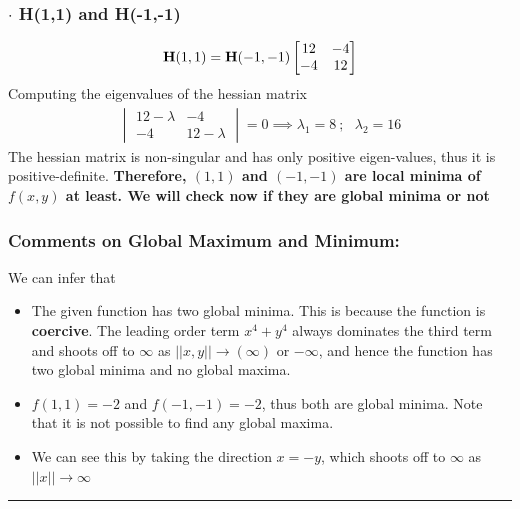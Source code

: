 \subsubsection*{$\bm\cdot$ H(1,1) and H(-1,-1)}
\begin{align*}
{\bf H} (1,1) = {\bf H} (-1,-1)
\begin{bmatrix}
12 & -4 \\
-4 & 12
\end{bmatrix}
\end{align*}
Computing the eigenvalues of the hessian matrix
\begin{align*}
\begin{vmatrix}
12-\lambda & -4 \\
-4 & 12-\lambda
\end{vmatrix} = 0 \implies \lambda_1 = 8\ ; \ \ \ \lambda_2 = 16
\end{align*}
The hessian matrix is non-singular and has only positive eigen-values, thus it is positive-definite. {\bf Therefore, $(1,1)$ and $(-1,-1)$ are local minima of $f(x,y)$ at least. We will check now if they are global minima or not} 
\subsubsection*{Comments on Global Maximum and Minimum: }
We can infer that
\begin{itemize}
\item The given function has two global minima. This is because the function is {\bf coercive}. The leading order term $x^4+y^4$ always dominates the third term and shoots off to $\infty$ as $||x,y||\rightarrow (\infty)$ or $-\infty$, and hence the function has two global minima and no global maxima.  
\item $f(1,1) = -2$ and $f(-1,-1) = -2$, thus both are global minima. Note that it is not possible to find any global maxima. 
\item We can see this by taking the direction $x=-y$, which shoots off to $\infty$ as $||x||\rightarrow\infty$
\end{itemize}\hrule 
